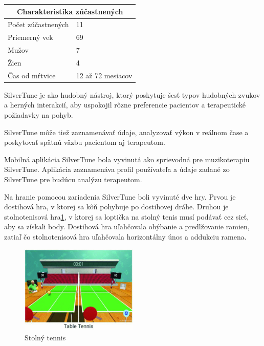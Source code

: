 \documentclass[10pt,twoside,slovak,a4paper]{article}
\begin{document}
\begin{tabular}{ |p{3cm}|p{3cm}| }
\hline
\multicolumn{2}{|c|}{Charakteristika zúčastnených} \\
\hline
Počet zúčastnených & 11 \\
\hline
Priemerný vek & 69 \\
\hline
Mužov & 7 \\
\hline
Žien & 4 \\
\hline
Čas od mŕtvice & 12 až 72 mesiacov \\
\hline
\end{tabular}
\newline
\newline
\newline
SilverTune je ako hudobný nástroj, ktorý poskytuje šesť typov hudobných zvukov a herných interakcií, aby uspokojil rôzne preferencie pacientov a terapeutické požiadavky na pohyb. 

SilverTune môže tiež zaznamenávať údaje, analyzovať výkon v reálnom čase a poskytovať spätnú väzbu pacientom aj terapeutom.

Mobilná aplikácia SilverTune bola vyvinutá ako sprievodná pre muzikoterapiu SilverTune. Aplikácia zaznamenáva profil používateľa a údaje zadané zo SilverTune pre budúcu analýzu terapeutom. 

Na hranie pomocou zariadenia SilverTune boli vyvinuté dve hry. Prvou je dostihová hra, v ktorej sa kôň pohybuje po dostihovej dráhe. Druhou je stolnotenisová hra\ref{fig:SilverTune Stolný tennis}, v ktorej sa loptička na stolný tenis musí podávať cez sieť, aby sa získali body. Dostihová hra uľahčovala ohýbanie a predlžovanie ramien, zatiaľ čo stolnotenisová hra uľahčovala horizontálny únos a addukciu ramena.

\begin{figure}
    \centering
    \includegraphics[width = 0.5\textwidth]{obrazky/table_tennnis.png}
    \caption{Stolný tennis}
    \label{fig:SilverTune Stolný tennis}
\end{figure}
\end{document}
